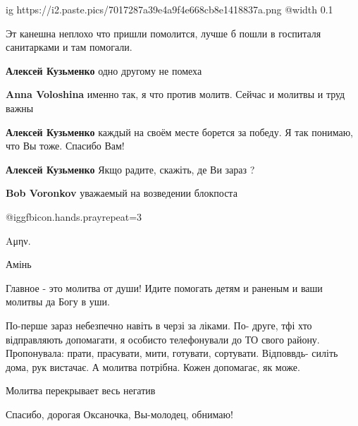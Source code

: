  
 
 
 
 
\zzSecCmt

\begin{itemize} %

\ifcmt
  ig https://i2.paste.pics/7017287a39e4a9f4e668cb8e1418837a.png
  @width 0.1
\fi


Эт канешна неплохо что пришли помолится, лучше б пошли в госпиталя санитарками
и там помогали.

\begin{itemize} %
\textbf{Алексей Кузьменко} одно другому не помеха

\textbf{Anna Voloshina} именно так, я что против молитв. Сейчас и молитвы и труд важны
\end{itemize} %

\textbf{Алексей Кузьменко} каждый на своём месте борется за победу. Я так понимаю, что Вы тоже.
Спасибо Вам!

\textbf{Алексей Кузьменко} Якщо радите, скажіть, де Ви зараз ?

\textbf{Bob Voronkov} уважаемый на возведении блокпоста

 @igg{fbicon.hands.pray}{repeat=3} 

Αμην.

Амінь

Главное - это молитва от души! Идите помогать детям и раненым и ваши молитвы да Богу в уши.


По-перше зараз небезпечно навіть в черзі за ліками. По- друге, тфі хто
відправляють допомагати, я особисто телефонували до ТО свого району.
Пропонувала: прати, прасувати, мити, готувати, сортувати. Відповвдь- силіть
дома, рук вистачає. А молитва потрібна. Кожен допомагає, як може.

Молитва перекрывает весь негатив

Спасибо, дорогая Оксаночка, Вы-молодец, обнимаю!

\end{itemize} %
